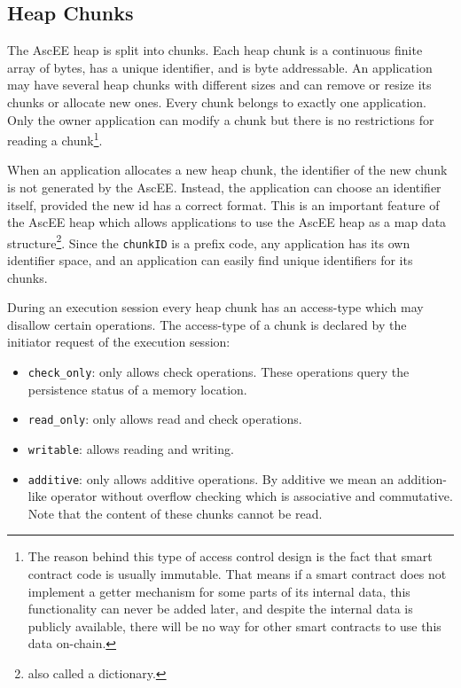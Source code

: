 \subsection{Heap Chunks}\label{subsec:heap}

The AscEE heap is split into chunks. Each heap chunk is a continuous finite array of bytes, has a unique identifier, and
is byte addressable. An application may have several heap chunks with different sizes and can remove or
resize its chunks or allocate new ones. Every chunk belongs to exactly one application. Only the owner application can
modify a chunk but there is no restrictions for reading a chunk\footnote{The reason behind this type of access
control design is the fact that smart contract
code is usually immutable. That means if a smart contract does not implement a
getter mechanism for some parts of its internal data, this functionality can never
be added later, and despite the internal data is publicly available, there will be no
way for other smart contracts to use this data on-chain.}.

When an application allocates a new heap chunk, the identifier of the new chunk is not generated by
the AscEE. Instead, the application can choose an identifier itself, provided the new id has a correct format. This
is an important feature of the AscEE heap which allows applications to use the AscEE heap as a map
data structure\footnote{also called a dictionary.}.
Since the \texttt{chunkID} is a prefix code, any application has its own identifier space, and an application
can easily find unique identifiers for its chunks.

During an execution session every heap chunk has an access-type which may disallow certain operations. The
access-type of a chunk is declared by the initiator request of the execution session:

\begin{itemize}
    \item \texttt{check\_only}: only allows check operations. These operations query the persistence
    status of a memory location.
    \item \texttt{read\_only}: only allows read and check operations.
    \item \texttt{writable}: allows reading and writing.
    \item \texttt{additive}: only allows additive operations. By additive we mean an addition-like operator without
    overflow checking which is associative and commutative. Note that the content of these chunks cannot be read.
\end{itemize}

